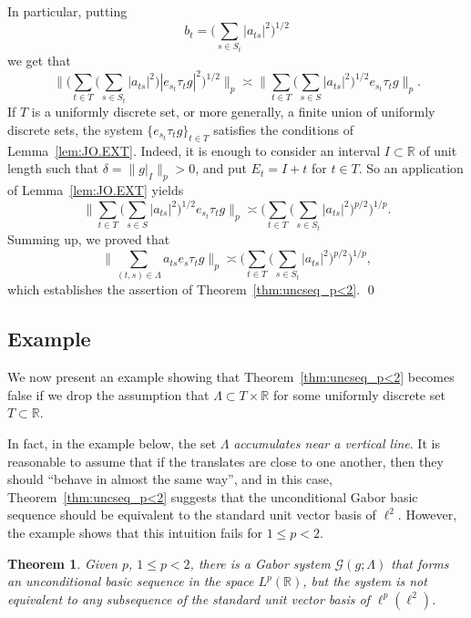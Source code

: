 \documentclass[reqno,a4paper,12pt]{amsart}
\numberwithin{equation}{section}
\numberwithin{figure}{section}
\newcommand\R{\mathbb{R}}
\newcommand\G{\mathcal{G}}
\newcommand\del{\delta}
\newcommand\1{\mathds{1}}
\newcommand{\TTT}{T}
\newcommand{\SSS}{S}
\newcommand{\ts}{\tau}
\renewcommand\le{\leqslant}
\theoremstyle{plain}
\newtheorem{thm}{Theorem}[section]
\newcommand{\thmref}[1]{Theorem~\ref{#1}}
\newcommand{\lemref}[1]{Lemma~\ref{#1}}
\theoremstyle{definition}
\begin{document}
In particular, putting
\begin{equation}
b_t =  \Big( \sum_{s\in \SSS_t} |a_{ts}|^2 \Big)^{1/2}
\end{equation}
we get that 
\begin{equation}
\Big\|\Big( \sum_{t\in \TTT} \Big( \sum_{s\in \SSS_t} |a_{ts}|^2 \Big)  |e_{s_t} \ts_t g|^2 \Big)^{1/2}\Big\|_p \asymp \Big\| \sum_{t\in \TTT} \Big( \sum_{s\in \SSS}|a_{ts}|^2 \Big)^{1/2}  e_{s_t} \ts_t g \Big\|_p.
\end{equation}
If $\TTT$ is a uniformly discrete set, or more generally, a finite union of uniformly discrete sets, the system $\{e_{s_t} \ts_t g\}_{t\in \TTT}$ satisfies the conditions of \lemref{lem:JO.EXT}. Indeed, it is enough to consider an interval $I\subset\R$ of unit length such that $\del = \|g|_I\|_p > 0$, and put $E_t = I+t$ for $t\in \TTT$. So an application of \lemref{lem:JO.EXT} yields
\begin{equation}
\Big\| \sum_{t\in \TTT} \Big( \sum_{s\in \SSS}|a_{ts}|^2 \Big)^{1/2}  e_{s_t} \ts_t g \Big\|_p \asymp \Big( \sum_{t\in \TTT} \Big( \sum_{s\in \SSS_t}|a_{ts}|^2 \Big)^{p/2} \Big)^{1/p}.
\end{equation}
Summing up, we proved that
\begin{equation}
\Big\|\sum_{(t,s)\in\Lambda}  a_{ts} e_s \ts_t g\Big\|_p\asymp \Big( \sum_{t\in \TTT} \Big( \sum_{s\in \SSS_t}|a_{ts}|^2 \Big)^{p/2} \Big)^{1/p}, 
\end{equation}
which establishes the assertion of \thmref{thm:uncseq_p<2}.
\qed

\subsection{Example}
We now present an example showing that \thmref{thm:uncseq_p<2} 
becomes false if we drop the assumption that
$\Lambda\subset \TTT\times \R$ for some uniformly discrete set $\TTT\subset\R$.


In fact, in the example below, the set $\Lambda$ \emph{accumulates near a vertical line}. It is reasonable to assume that if the translates are close to one another, then they should ``behave in almost the same way'', and in this case, \thmref{thm:uncseq_p<2} suggests that the unconditional Gabor basic sequence should be equivalent to the standard unit vector basis of $\ell^2$. However, the example shows that this intuition fails for $1 \le p < 2$.

\begin{thm}
\label{thm:u.b.e.p<2}
Given $p$, $1 \le p < 2$, there is a Gabor system $\G(g;\Lambda)$ that forms an unconditional basic sequence in the space $L^p(\R)$, but the system is not equivalent to any sub\-sequence of the standard unit vector basis of $\ell^p(\ell^2)$.
\end{thm}
\end{document}
